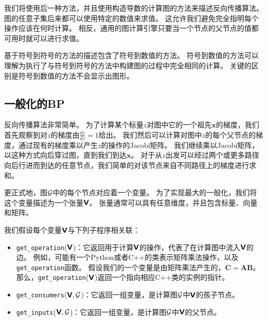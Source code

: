 我们将使用后一种方法，并且使用构造导数的计算图的方法来描述反向传播算法。
图的任意子集后来都可以使用特定的数值来求值。
这允许我们避免完全指明每个操作应该在何时计算。
相反，通用的图计算引擎只要当一个节点的父节点的值都可用时就可以进行求值。

  
基于符号到符号的方法的描述包含了符号到数值的方法。
符号到数值的方法可以理解为执行了与符号到符号的方法中构建图的过程中完全相同的计算。
关键的区别是符号到数值的方法不会显示出图形。

\subsection{一般化的BP}
\label{sec:general_back_propagation}

反向传播算法非常简单。
为了计算某个标量$z$对图中它的一个祖先$\bm{x}$的梯度，我们首先观察到对$z$的梯度由$\frac{dz}{dz}=1$给出。
我们然后可以计算对图中$z$的每个父节点的梯度，通过现有的梯度乘以产生$z$的操作的Jacobi矩阵。
我们继续乘以Jacobi矩阵，以这种方式向后穿过图，直到我们到达$\bm{x}$。
对于从$z$出发可以经过两个或更多路径向后行进而到达的任意节点，我们简单的对该节点来自不同路径上的梯度进行求和。

更正式地，图$\mathcal{G}$中的每个节点对应着一个变量。
为了实现最大的一般化，我们将这个变量描述为一个张量$\textsf{\textbf{V}}$。
张量通常可以具有任意维度，并且包含标量、向量和矩阵。

我们假设每个变量$\textsf{\textbf{V}}$与下列子程序相关联：
\begin{itemize}
    \item \verb|get_operation|($\textsf{\textbf{V}}$)：它返回用于计算$\textsf{\textbf{V}}$的操作，代表了在计算图中流入$\textsf{\textbf{V}}$的边。
    例如，可能有一个Python或者C++的类表示矩阵乘法操作，以及\verb|get_operation|函数。
    假设我们的一个变量是由矩阵乘法产生的，$\bm{C}=\bm{A}\bm{B}$。
    那么，\verb|get_operation|($\textsf{\textbf{V}}$)返回一个指向相应C++类的实例的指针。

    \item \verb|get_consumers|($\textsf{\textbf{V}}, \mathcal{G}$)：它返回一组变量，是计算图$\mathcal{G}$中$\textsf{\textbf{V}}$的孩子节点。

    \item \verb|get_inputs|($\textsf{\textbf{V}}, \mathcal{G}$)：它返回一组变量，是计算图$\mathcal{G}$中$\textsf{\textbf{V}}$的父节点。
\end{itemize}

  
